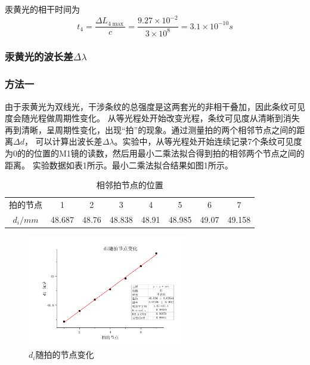 \documentclass{article}
\begin{document}
    汞黄光的相干时间为
    $$t_4=\frac{\Delta L_{4\max }}{c}=\frac{9.27\times 10^{-2}}{3\times 10^8}=3.1\times 10^{-10}s$$

    \subsubsection{汞黄光的波长差$\Delta \lambda$}
    \subsubsection{方法一}
    由于汞黄光为双线光，干涉条纹的总强度是这两套光的非相干叠加，因此条纹可见度会随光程做周期性变化。
    从等光程处开始改变光程，条纹可见度从清晰到消失再到清晰，呈周期性变化，出现“拍”的现象。通过测量拍的两个相邻节点之间的距离$\Delta d$，
    可以计算出波长差$\Delta \lambda$。实验中，从等光程处开始连续记录7个条纹可见度为0的的位置的M1镜的读数，然后用最小二乘法拟合得到拍的相邻两个节点之间的距离。
    实验数据如表1所示。最小二乘法拟合结果如图1所示。

    \begin{table}[htbp]
        \centering
        \caption{相邻拍节点的位置}
        \vspace{1ex}
        \begin{tabular}{cccccccc}
          \toprule
          拍的节点  & 1     & 2     & 3     & 4     & 5     & 6     & 7 \\
          $d_i/mm$ & 48.687 & 48.76 & 48.838 & 48.91 & 48.985 & 49.07 & 49.158 \\
          \bottomrule
        \end{tabular}%
    \end{table}%

    \begin{figure}[htbp]
        \centering
        \includegraphics[width=0.62\textwidth]{di随节点变化.jpg}
        \caption{$d_i$随拍的节点变化}
    \end{figure}
\end{document}
